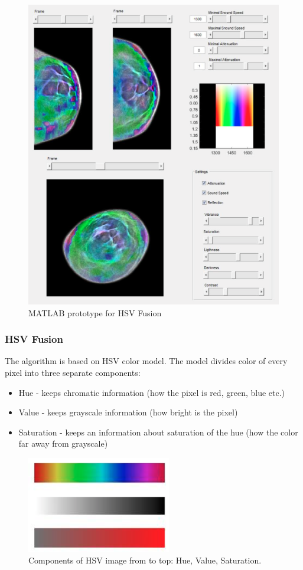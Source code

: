 \documentclass[english]{article}
\begin{document}
\begin{figure}
\centerline{\includegraphics[scale=0.4]{internship_report/pro}}
\caption{MATLAB prototype for HSV Fusion\label{fig:pro}}
\end{figure}
\subsubsection{HSV Fusion}

The algorithm is based on HSV color model. The model divides color of every pixel into three separate components:

\begin{itemize}
\item Hue - keeps chromatic information (how the pixel is red, green, blue etc.)
\item Value - keeps grayscale information (how bright is the pixel)
\item Saturation - keeps an information about saturation of the hue (how the color far away from grayscale)
\end{itemize}

\begin{figure}[H]
\centerline{\includegraphics[scale=0.6]{internship_report/hsv}}
\caption{Components of HSV image from to top: Hue, Value, Saturation.\label{fig:hsv}}
\end{figure}
\end{document}
